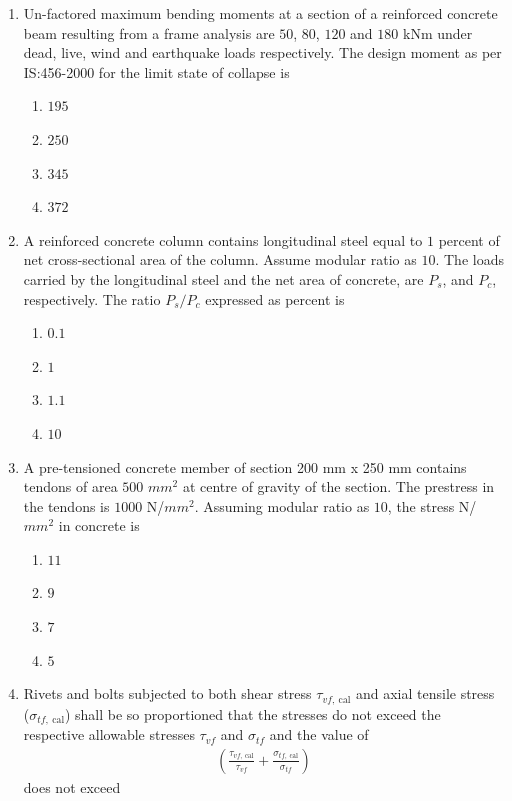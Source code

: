 \documentclass[journal]{IEEEtran}
\begin{document}
\begin{enumerate}
\item Un-factored maximum bending moments at a section of a reinforced concrete beam resulting from
a frame analysis are $50$, $80$, $120$ and $180$ kNm under dead, live, wind and earthquake loads
respectively. The design moment  as per IS:456-2000 for the limit state of collapse 
is \hfill {}

\begin{enumerate}
\item $195$
\item $250$
\item $345$
\item $372$
\end{enumerate}

\item A reinforced concrete column contains longitudinal steel equal to $1$ percent of net cross-sectional area of the column. Assume modular ratio as $10$. The loads carried  by the longitudinal steel and the net area of concrete, are $P_s$, and $P_c$, respectively. The ratio $P_s/P_c$ expressed
as percent is \hfill {}

\begin{enumerate}
\item $0.1$
\item $1$
\item $1.1$
\item $10$
\end{enumerate}

\item A pre-tensioned concrete member of section 200 mm x 250 mm contains tendons of area $500$ $mm^{2}$
at centre of gravity of the section. The prestress in the tendons is $1000$ N/$mm^{2}$. Assuming modular
ratio as $10$, the stress N/$mm^{2}$ in concrete is \hfill {}

\begin{enumerate}
\item $11$
\item $9$
\item $7$
\item $5$
\end{enumerate}

\item Rivets and bolts subjected to both shear stress $\tau_{vf,\ \text{cal}}$ and axial tensile stress ($\sigma_{tf,\ \text{cal}}$) shall be so proportioned that the stresses do not exceed the respective allowable stresses $\tau_{vf}$ and $\sigma_{tf}$ and the value of
\begin{align}
\left( \frac{\tau_{vf,\ \text{cal}}}{\tau_{vf}} + \frac{\sigma_{tf,\ \text{cal}}}{\sigma_{tf}} \right)
\end{align}
does not exceed \hfill {}


\end{enumerate}
\end{document}
